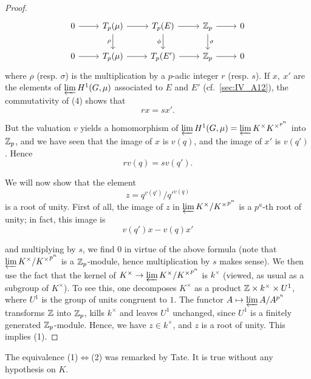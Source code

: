 \begin{subappendices}
\begin{proof}
\[\begin{tikzcd}
	0 & {T_p(\mu)} & {T_p(E)} & {\Z_p} & 0 \\
	0 & {T_p(\mu)} & {T_p(E')} & {\Z_p} & 0
	\arrow[from=1-1, to=1-2]
	\arrow[from=1-2, to=1-3]
	\arrow["\rho"', from=1-2, to=2-2]
	\arrow[from=1-3, to=1-4]
	\arrow["\phi"', from=1-3, to=2-3]
	\arrow[from=1-4, to=1-5]
	\arrow["\sigma", from=1-4, to=2-4]
	\arrow[from=2-1, to=2-2]
	\arrow[from=2-2, to=2-3]
	\arrow[from=2-3, to=2-4]
	\arrow[from=2-4, to=2-5]
\end{tikzcd}\]
where $\rho$ (resp. $\sigma$) is the multiplication by a $p$-adic integer $r$
(resp. $s$). If $x, ~x'$ are the elements of $\varprojlim H^1(G, \mu)$
associated to $E$ and $E'$ (cf.\ \ref{sec:IV_A12}), the commutativity of (4)
shows that
\[
rx = sx'.
\]

But the valuation $v$ yields a homomorphism of $\varprojlim H^1(G, \mu) =
\varprojlim K^\times K^{\times^{p^n}}$ into $\mathbb{Z}_p$, and we have seen that the
image of $x$ is $v(q)$, and the image of $x'$ is $v(q')$. Hence
\[
rv(q) = sv(q').
\]

We will now show that the element
\[
z = q^{v(q')}/q'^{v(q)}
\]
\dpage
is a root of unity. First of all, the image of $z$ in $\varprojlim K^\times /
{K^\times}^{p^n}$ is a $p^a$-th root of unity; in fact, this image is
\[
v(q')x - v(q)x'
\]

and multiplying by $s$, we find $0$ in virtue of the above formula (note that
$\varprojlim {K^\times} / {K^\times}^{p^n}$ is a $\mathbb{Z}_p$-module, hence multiplication
by $s$ makes sense). We then use the fact that the kernel of $K^\times \to
\varprojlim K^\times / {K^\times}^{p^n}$ is $k^\times$ (viewed, as usual as a
subgroup of $K^\times$). To see this, one decomposes $K^\times$ as a product $\mathbb{Z}
\times k^\times \times U^1$, where
$U^1$ is the group of units congruent to $1$. The functor $A \mapsto \varprojlim
A/ A^{p^n}$ transforms $\mathbb{Z}$ into $\mathbb{Z}_p$, kills $k^\times$ and leaves $U^1$
unchanged, since $U^1$ is a finitely generated $\mathbb{Z}_p$-module. Hence, we have $z
\in k^\times$, and $z$ is a root of unity. This implies (1).
\end{proof}

\begin{obs}
The equivalence (1)$\iff$(2) was remarked by Tate. It is true without any
hypothesis on $K$.
\end{obs}


\end{subappendices}
